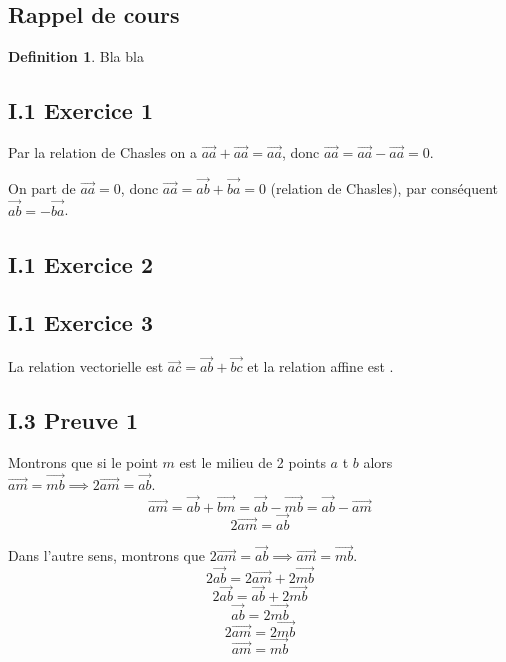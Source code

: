 \documentclass[]{book}
\theoremstyle{definition}
\newtheorem{defn}{Definition}
\newcommand{\vect}[1]{\overrightarrow{#1}}
\begin{document}
\subsection*{Rappel de cours}
\begin{defn}
Bla bla
\end{defn}



\newpage
\subsection*{I.1 Exercice 1}
Par la relation de Chasles on a $\vect{aa} + \vect{aa} = \vect{aa}$, donc $\vect{aa} = \vect{aa} - \vect{aa} = 0$.


On part de $\vect{aa} = 0$, donc $\vect{aa} = \vect{ab} + \vect{ba} = 0$ (relation de Chasles), par cons\'equent $\vect{ab} = -\vect{ba}$.

\subsection*{I.1 Exercice 2}

\subsection*{I.1 Exercice 3}

La relation vectorielle est $\vect{ac} = \vect{ab} + \vect{bc}$ et la relation affine est .


\subsection*{I.3 Preuve 1}
Montrons que si le point $m$ est le milieu de 2 points $a$ t $b$ alors $\vect{am} = \vect{mb} \implies 2\vect{am} = \vect{ab}$.
$$\vect{am} = \vect{ab} + \vect{bm} = \vect{ab} - \vect{mb} = \vect{ab} - \vect{am}$$ 
$$2\vect{am} = \vect{ab}$$

Dans l'autre sens, montrons que $2\vect{am} = \vect{ab} \implies \vect{am} = \vect{mb}$. 
$$2\vect{ab} = 2\vect{am}+2\vect{mb}$$
$$2\vect{ab} = \vect{ab}+2\vect{mb}$$ 
$$\vect{ab} = 2\vect{mb}$$
$$2\vect{am} = 2\vect{mb}$$ 
$$\vect{am} = \vect{mb}$$ 
\end{document}
